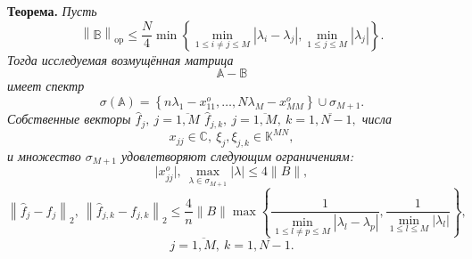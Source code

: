 \begingroup
\textbf{Теорема.}\itshape
    Пусть
    \[
        \left\| \mathbb{B} \right\|_{\mathrm{op}}
        \leq 
        \frac{N}{4}
         \min\left\{
             \min\limits_{1\leq i{\neq}j \leq M }{|\lambda_i - \lambda_j|},
             \min\limits_{1\leq j \leq M}{|\lambda_j|}
         \right\}.
        \]
    Тогда исследуемая возмущённая матрица
    \[
        \mathbb{A} - \mathbb{B}
        \]
    имеет спектр
    \[
        \sigma\left(\mathbb{A}\right) =
        \left\{
            n\lambda_1 - x_{11}^o, \ldots, N\lambda_M - x_{MM}^o
        \right\}
        \cup \sigma_{M{+}1}.
        \]
    Собственные векторы
    \(
        \hat{f}_j,
        \ j{=}\overline{1,M}
        \)
    \(
        \hat{f}_{j,k},
        \ j{=}\overline{1,M},
        \ k{=}\overline{1,N{-}1},
        \)
    числа
    \[
        x_{jj}{\in}\mathbb{C},
        \ \xi_j, \xi_{j,k}{\in}\mathbb{K}^{MN},
        \]
    и множество \( \sigma_{M{+}1} \)
    удовлетворяют следующим ограничениям:
\[
    \lvert x_{jj}^o\rvert,
    \ \max_{\lambda\in\sigma_{M{+}1}} \lvert\lambda\rvert
    \leq 4\|B\|,
\]
\[
    \left\| \hat{f}_j - f_j \right\|_2,
    \ \left\| \hat{f}_{j,k} - f_{j,k}\right\|_2
    \leq
    \frac4n \|B\|
         \max\left\{
         \frac{1}{
             \min\limits_{1\leq l{\neq}p \leq M }{|\lambda_l - \lambda_p|}},
         \frac{1}{
             \min\limits_{1\leq l \leq M}{|\lambda_l|}}
         \right\},
\]
    \[
        j{=}\overline{1,M},
        \ k{=}\overline{1,N{-}1}.
        \]
\endgroup
